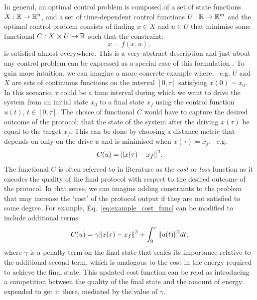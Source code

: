 In general, an optimal control problem is composed of a set of state functions $X: \mathbb{R} \rightarrow \mathbb{R}^n$, and a set of time-dependent control functions $U:\mathbb{R} \rightarrow \mathbb{R}^m$ and the optimal control problem consists of finding $x \in X$ and $u \in U$ that minimise some functional $C: X \cross U \rightarrow \mathbb{R}$ such that the constraint:
\begin{equation}\label{eq:control_ODE}
    \dot{x} = f(x, u),
\end{equation}
is satisfied almost everywhere. This is a very abstract description and just about any control problem can be expressed as a special case of this formulation \cite{dalessandro_introduction_2021}. To gain more intuition, we can imagine a more concrete example where, \@~e.g. $U$ and $X$ are sets of continuous functions on the interval $[0, \tau]$ satisfying $x(0) = x_0$. In this scenario, $\tau$ could be a time interval during which we want to drive the system from an initial state $x_0$ to a final state $x_f$ using the control function $u(t)$, $t \in [0, \tau]$. The choice of functional $C$ would have to capture the desired outcome of the protocol: that the state of the system after the driving $x(\tau)$ be equal to the target $x_f$. This can be done by choosing a distance metric that depends on only on the drive $u$ and is minimised when $x(\tau) = x_f$, \@~e.g.
\begin{equation}\label{eq:example_cost_func}
    C(u) = \norm{x(\tau)  - x_f}^2.
\end{equation}
The functional $C$ is often referred to in literature as the \emph{cost} or \emph{loss} function \cite{wald_statistical_1950} as it encodes the quality of the final protocol with respect to the desired outcome of the protocol. In that sense, we can imagine adding constraints to the problem that may increase the `cost' of the protocol output if they are not satisfied to some degree. For example, Eq.~\eqref{eq:example_cost_func} can be modified to include additional terms:
\begin{equation}\label{eq:example_cost_func2}
    C(u) = \gamma \norm{x(\tau)  - x_f}^2 + \int_0^{\tau} \norm{u(t)}^2 dt,
\end{equation}
where $\gamma$ is a penalty term on the final state that scales its importance relative to the additional second term, which is analogous to the cost in the energy required to achieve the final state. This updated cost function can be read as introducing a competition between the quality of the final state and the amount of energy expended to get it there, mediated by the value of $\gamma$. 

